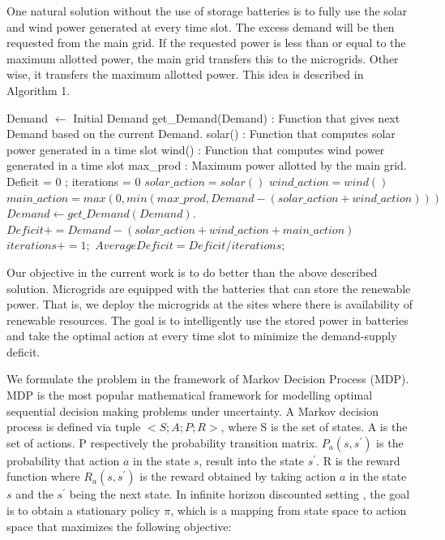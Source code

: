\documentclass[conference]{IEEEtran}
\begin{document}
One natural solution without the use of storage batteries is to fully use the solar and wind power generated at every time slot. The excess demand will be then requested from the main grid. If the requested power is less than or equal to the maximum allotted power, the main grid transfers this to the microgrids. Other wise, it transfers the maximum allotted power. This idea is described in Algorithm 1.


\begin{algorithm}
\caption{}
\label{greedy}
\begin{algorithmic}[1]
	\State Demand $\leftarrow$ Initial Demand
    \State get\_Demand(Demand) : Function that gives next Demand based on the current Demand.
    \State solar() : Function that computes solar power generated in a time slot
    \State wind() : Function that computes wind power generated in a time slot
    \State max\_prod : Maximum power allotted by the main grid.
    \State Deficit = 0 ; iterations = 0
     \State $solar\_action = solar()$
     \State $wind\_action = wind()$
     \State $main\_action = max(0,min(max\_prod, Demand - (solar\_action+wind\_action)))$
     \State $Demand \leftarrow get\_Demand(Demand).$
     \State $Deficit += Demand - (solar\_action + wind\_action + main\_action)$
     \State $iterations += 1;$
    \EndProcedure
    \State $Average Deficit = Deficit/iterations;$
    
\end{algorithmic}
\end{algorithm}


Our objective in the current work is to do better than the above described solution. Microgrids are equipped with the batteries that can store the renewable power. That is, we deploy the microgrids at the sites where there is availability of renewable resources. The goal is to intelligently use the stored power in batteries and take the optimal action at every time slot to minimize the demand-supply deficit.

We formulate the problem in the framework of Markov Decision Process (MDP). MDP \cite{sutton} is the most popular mathematical framework for modelling optimal sequential decision making problems under uncertainty. A Markov decision process is defined via tuple $< S; A; P;R >$, where S is the set of states. A is the set of actions. P respectively the probability transition matrix. $P_{a}(s,s^{'})$ is the probability that action $a$ in the state $s$, result into the state $s^{'}$. R is the reward function where $R_{a}(s,s^{'})$ is the reward obtained by taking action $a$ in the state $s$ and the $s^{'}$ being the next state. In infinite horizon discounted setting \cite{vol1}, the goal is to obtain a stationary policy $\pi$, which is a mapping from state space to action space that maximizes the following objective:
\end{document}
